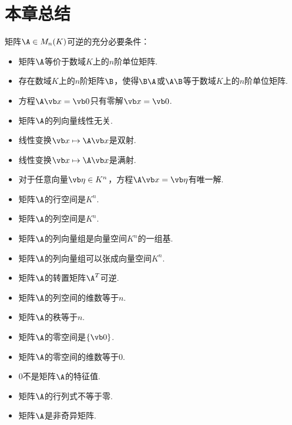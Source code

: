 \section{本章总结}
矩阵\(\A \in M_n(K)\)可逆的充分必要条件：\begin{itemize}
	\item 矩阵\(\A\)等价于数域\(K\)上的\(n\)阶单位矩阵.
	\item 存在数域\(K\)上的\(n\)阶矩阵\(\B\)，使得\(\B\A\)或\(\A\B\)等于数域\(K\)上的\(n\)阶单位矩阵.
	\item 方程\(\A\x=\vb0\)只有零解\(\x=\vb0\).
	\item 矩阵\(\A\)的列向量线性无关.
	\item 线性变换\(\x \mapsto \A\x\)是双射.
	\item 线性变换\(\x \mapsto \A\x\)是满射.
	\item 对于任意向量\(\b \in K^n\)，方程\(\A\x=\b\)有唯一解.
	\item 矩阵\(\A\)的行空间是\(K^n\).
	\item 矩阵\(\A\)的列空间是\(K^n\).
	\item 矩阵\(\A\)的列向量组是向量空间\(K^n\)的一组基.
	\item 矩阵\(\A\)的列向量组可以张成向量空间\(K^n\).
	\item 矩阵\(\A\)的转置矩阵\(\A^T\)可逆.
	\item 矩阵\(\A\)的列空间的维数等于\(n\).
	\item 矩阵\(\A\)的秩等于\(n\).
	\item 矩阵\(\A\)的零空间是\(\{\vb0\}\).
	\item 矩阵\(\A\)的零空间的维数等于\(0\).
	\item \(0\)不是矩阵\(\A\)的特征值.
	\item 矩阵\(\A\)的行列式不等于零.
	\item 矩阵\(\A\)是非奇异矩阵.
\end{itemize}
